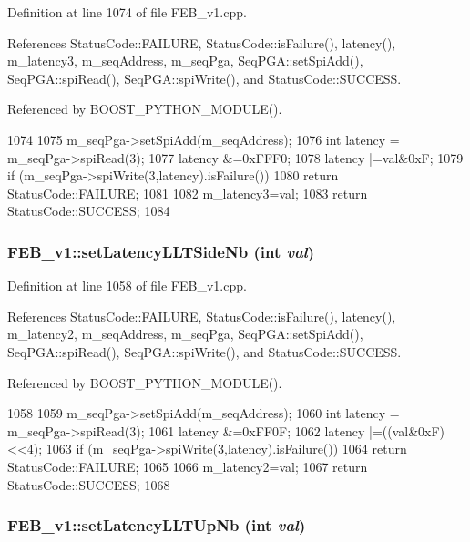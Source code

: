 Definition at line 1074 of file FEB\_\-v1.cpp.

References StatusCode::FAILURE, StatusCode::isFailure(), latency(), m\_\-latency3, m\_\-seqAddress, m\_\-seqPga, SeqPGA::setSpiAdd(), SeqPGA::spiRead(), SeqPGA::spiWrite(), and StatusCode::SUCCESS.

Referenced by BOOST\_\-PYTHON\_\-MODULE().


\begin{DoxyCode}
1074                                              {
1075   m_seqPga->setSpiAdd(m_seqAddress);
1076   int latency = m_seqPga->spiRead(3);
1077   latency &=0xFFF0;
1078   latency |=val&0xF;
1079    if (m_seqPga->spiWrite(3,latency).isFailure()){
1080     return StatusCode::FAILURE;
1081   }
1082    m_latency3=val;
1083   return StatusCode::SUCCESS;   
1084 }
\end{DoxyCode}
\hypertarget{classFEB__v1_a840532b78d0062646116a076e65cf353}{
\subsubsection[{setLatencyLLTSideNb}]{ FEB\_\-v1::setLatencyLLTSideNb (int {\em val})}}
\label{classFEB__v1_a840532b78d0062646116a076e65cf353}


Definition at line 1058 of file FEB\_\-v1.cpp.

References StatusCode::FAILURE, StatusCode::isFailure(), latency(), m\_\-latency2, m\_\-seqAddress, m\_\-seqPga, SeqPGA::setSpiAdd(), SeqPGA::spiRead(), SeqPGA::spiWrite(), and StatusCode::SUCCESS.

Referenced by BOOST\_\-PYTHON\_\-MODULE().


\begin{DoxyCode}
1058                                              {
1059   m_seqPga->setSpiAdd(m_seqAddress);
1060   int latency = m_seqPga->spiRead(3);
1061   latency &=0xFF0F;
1062   latency |=((val&0xF)<<4);
1063    if (m_seqPga->spiWrite(3,latency).isFailure()){
1064     return StatusCode::FAILURE;
1065   }
1066    m_latency2=val;
1067   return StatusCode::SUCCESS;   
1068 }
\end{DoxyCode}
\hypertarget{classFEB__v1_a8a3aafdda0f1028e02c4a5850f987f32}{
\subsubsection[{setLatencyLLTUpNb}]{ FEB\_\-v1::setLatencyLLTUpNb (int {\em val})}}
\label{classFEB__v1_a8a3aafdda0f1028e02c4a5850f987f32}


